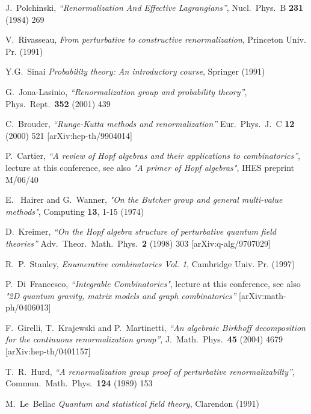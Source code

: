 \documentclass[12pt,here,feynmf]{article}
\begin{document}
\begin{thebibliography}{99}
J.~Polchinski,
  {\it ``Renormalization And Effective Lagrangians''}, 
  Nucl.\ Phys.\  B {\bf 231} (1984) 269


  V.~Rivasseau,
  {\it From perturbative to constructive renormalization},
  Princeton Univ. Pr. (1991) 


Y.G.~Sinai {\it Probability theory: An introductory course}, Springer (1991)

G.~Jona-Lasinio,
  {\it ``Renormalization group and probability theory''},
  Phys.\ Rept.\  {\bf 352} (2001) 439
  
  
  
   C.~Brouder,
  {\it ``Runge-Kutta methods and renormalization''}
  Eur.\ Phys.\ J.\  C {\bf 12} (2000) 521
  [arXiv:hep-th/9904014]

P.~Cartier,  {\it ``A review of Hopf algebras and their applications to combinatorics''}, lecture at this conference, see also {\it "A primer of Hopf algebras"}, IHES preprint M/06/40

E.~ Hairer and G.~Wanner, {\it "On the Butcher group and general multi-value methods"}, Computing {\bf
13}, 1-15 (1974)

  D.~Kreimer,
  {\it ``On the Hopf algebra structure of perturbative quantum field theories''}
  Adv.\ Theor.\ Math.\ Phys.\  {\bf 2} (1998) 303
  [arXiv:q-alg/9707029]

R.~P.~Stanley, {\it Enumerative combinatorics Vol. 1},  Cambridge Univ. Pr.  (1997)


P.~Di~Francesco, {\it ``Integrable Combinatorics"}, lecture at this conference, see also {\it "2D quantum gravity, matrix models and graph combinatorics''} [arXiv:math-ph/0406013]



  F.~Girelli, T.~Krajewski and P.~Martinetti,
  {\it ``An algebraic Birkhoff decomposition for the continuous renormalization group''},
  J.\ Math.\ Phys.\  {\bf 45} (2004) 4679
  [arXiv:hep-th/0401157]


T.~R.~Hurd,
  {\it ``A renormalization group proof of perturbative renormalizabilty''},
  Commun.\ Math.\ Phys.\  {\bf 124} (1989) 153





M.~Le~Bellac {\it Quantum and statistical field theory}, Clarendon (1991)



\end{thebibliography}
\end{document}

